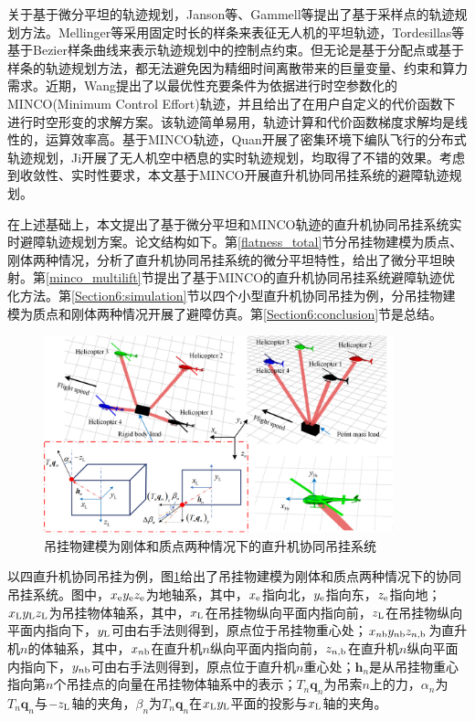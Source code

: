 关于基于微分平坦的轨迹规划，Janson等\cite{janson2015fast}、Gammell\cite{gammell2018informed}等提出了基于采样点的轨迹规划方法。Mellinger等\cite{mellinger2011minimum}采用固定时长的样条来表征无人机的平坦轨迹，Tordesillas等\cite{tordesillas2019faster}基于Bezier样条曲线来表示轨迹规划中的控制点约束。但无论是基于分配点或基于样条的轨迹规划方法，都无法避免因为精细时间离散带来的巨量变量、约束和算力需求。近期，Wang\cite{wang2022geometrically}提出了以最优性充要条件为依据进行时空参数化的MINCO(Minimum Control Effort)轨迹，并且给出了在用户自定义的代价函数下进行时空形变的求解方案。该轨迹简单易用，轨迹计算和代价函数梯度求解均是线性的，运算效率高。基于MINCO轨迹，Quan\cite{quan2022distributed}开展了密集环境下编队飞行的分布式轨迹规划，Ji\cite{ji2022real}开展了无人机空中栖息的实时轨迹规划，均取得了不错的效果。考虑到收敛性、实时性要求，本文基于MINCO开展直升机协同吊挂系统的避障轨迹规划。

在上述基础上，本文提出了基于微分平坦和MINCO轨迹的直升机协同吊挂系统实时避障轨迹规划方案。论文结构如下。第\ref{flatness_total}节分吊挂物建模为质点、刚体两种情况，分析了直升机协同吊挂系统的微分平坦特性，给出了微分平坦映射。第\ref{minco_multilift}节提出了基于MINCO的直升机协同吊挂系统避障轨迹优化方法。第\ref{Section6:simulation}节以四个小型直升机协同吊挂为例，分吊挂物建模为质点和刚体两种情况开展了避障仿真。第\ref{Section6:conclusion}节是总结。

\begin{figure}
    \centering
    \includegraphics[width = 0.9\textwidth]{fig/figure_chap6/chap6_coordinates.png}
    \caption{吊挂物建模为刚体和质点两种情况下的直升机协同吊挂系统\label{figure6:coordinates}}
\end{figure}

以四直升机协同吊挂为例，图\ref{figure6:coordinates}给出了吊挂物建模为刚体和质点两种情况下的协同吊挂系统。图中，$x_{\rm{e}}y_{\rm{e}}z_{\rm{e}}$为地轴系，其中，$x_{\rm{e}}$指向北，$y_{\rm{e}}$指向东，$z_{\rm{e}}$指向地；$x_{\rm{L}}y_{\rm{L}}z_{\rm{L}}$为吊挂物体轴系，其中，$x_{\rm{L}}$在吊挂物纵向平面内指向前，$z_{\rm{L}}$在吊挂物纵向平面内指向下，$y_{\rm{L}}$可由右手法则得到，原点位于吊挂物重心处；$x_{n\rm{b}}y_{n\rm{b}}z_{n,\rm{b}}$为直升机$n$的体轴系，其中，$x_{n\rm{b}}$在直升机$n$纵向平面内指向前，$z_{n,\rm{b}}$在直升机$n$纵向平面内指向下，$y_{n\rm{b}}$可由右手法则得到，原点位于直升机$n$重心处；$\boldsymbol{h}_n$是从吊挂物重心指向第$n$个吊挂点的向量在吊挂物体轴系中的表示；$T_n\boldsymbol{q}_n$为吊索$n$上的力，$\alpha_n$为$T_n\boldsymbol{q}_n$与$-z_{\rm{L}}$轴的夹角，$\beta_n$为$T_n\boldsymbol{q}_n$在$x_{\rm{L}}y_{\rm{L}}$平面的投影与$x_{\rm{L}}$轴的夹角。

